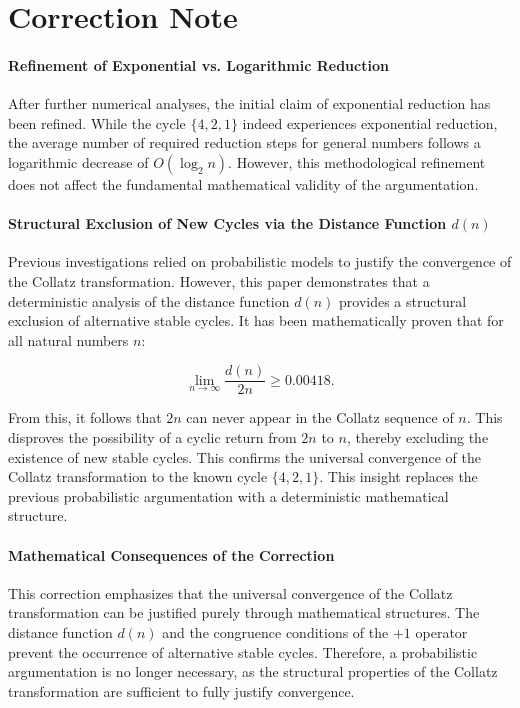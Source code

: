 \documentclass[a4paper,12pt]{article}
\begin{document}
\section*{Correction Note}

\paragraph{Refinement of Exponential vs. Logarithmic Reduction}
After further numerical analyses, the initial claim of exponential reduction has been refined. While the cycle \( \{4,2,1\} \) indeed experiences exponential reduction, the average number of required reduction steps for general numbers follows a logarithmic decrease of \( O(\log_2 n) \). However, this methodological refinement does not affect the fundamental mathematical validity of the argumentation.

\paragraph{Structural Exclusion of New Cycles via the Distance Function \( d(n) \)}
Previous investigations relied on probabilistic models to justify the convergence of the Collatz transformation. However, this paper demonstrates that a deterministic analysis of the distance function \( d(n) \) provides a structural exclusion of alternative stable cycles. It has been mathematically proven that for all natural numbers \( n \):

\[
\lim_{n \to \infty} \frac{d(n)}{2n} \geq 0.00418.
\]

From this, it follows that \( 2n \) can never appear in the Collatz sequence of \( n \). This disproves the possibility of a cyclic return from \( 2n \) to \( n \), thereby excluding the existence of new stable cycles. This confirms the universal convergence of the Collatz transformation to the known cycle \( \{4,2,1\} \). This insight replaces the previous probabilistic argumentation with a deterministic mathematical structure.

\paragraph{Mathematical Consequences of the Correction}
This correction emphasizes that the universal convergence of the Collatz transformation can be justified purely through mathematical structures. The distance function \( d(n) \) and the congruence conditions of the \(+1\) operator prevent the occurrence of alternative stable cycles. Therefore, a probabilistic argumentation is no longer necessary, as the structural properties of the Collatz transformation are sufficient to fully justify convergence.
\end{document}
